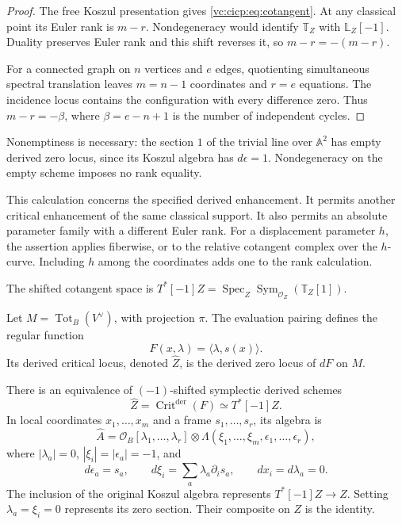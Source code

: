 \begin{proof}
The free Koszul presentation gives \eqref{vc:cicp:eq:cotangent}.
At any classical point its Euler rank is $m-r$.
Nondegeneracy would identify
$\mathbb T_Z$ with $\mathbb L_Z[-1]$. Duality preserves
Euler rank and this shift reverses it, so $m-r=-(m-r)$.

For a connected graph on $n$ vertices and $e$ edges, quotienting
simultaneous spectral translation leaves $m=n-1$ coordinates
and $r=e$ equations. The incidence locus contains the
configuration with every difference zero. Thus $m-r=-\beta$, where
$\beta=e-n+1$ is the number of independent cycles.
\end{proof}

Nonemptiness is necessary: the section $1$ of the trivial
line over $\mathbb A^2$ has empty derived zero locus, since
its Koszul algebra has $d\epsilon=1$. Nondegeneracy on the
empty scheme imposes no rank equality.

This calculation concerns the specified derived enhancement.
It permits another critical enhancement of the same classical
support. It also permits an absolute parameter family with a
different Euler rank. For a displacement parameter $h$, the
assertion applies fiberwise, or to the relative cotangent
complex over the $h$-curve. Including $h$ among the coordinates
adds one to the rank calculation.

The shifted cotangent space is
$T^*[-1]Z=\operatorname{Spec}_Z
\operatorname{Sym}_{\mathcal O_Z}(\mathbb T_Z[1])$.

Let $M=\operatorname{Tot}_B(V^\vee)$, with projection $\pi$.
The evaluation pairing defines the regular function
\begin{equation}\label{vc:cicp:eq:potential}
 F(x,\lambda)=\langle\lambda,s(x)\rangle.
\end{equation}
Its derived critical locus, denoted $\widehat Z$, is the derived
zero locus of $dF$ on $M$.

\begin{theorem}\label{vc:cicp:thm:completion}
There is an equivalence of $(-1)$-shifted symplectic derived
schemes
\begin{equation}\label{vc:cicp:eq:completion}
 \widehat Z=\operatorname{Crit}^{\mathrm{der}}(F)
       \simeq T^*[-1]Z.
\end{equation}
In local coordinates $x_1,\ldots,x_m$ and a frame
$s_1,\ldots,s_r$, its algebra is
\begin{equation}\label{vc:cicp:eq:critical-algebra}
 \widehat A=\mathcal O_B[\lambda_1,\ldots,\lambda_r]
       \otimes\Lambda(\xi_1,\ldots,\xi_m,
                       \epsilon_1,\ldots,\epsilon_r),
\end{equation}
where $|\lambda_a|=0$, $|\xi_i|=|\epsilon_a|=-1$, and
\begin{equation}\label{vc:cicp:eq:differential}
 d\epsilon_a=s_a,\qquad
 d\xi_i=\sum_a\lambda_a\partial_i s_a,\qquad
 dx_i=d\lambda_a=0.
\end{equation}
The inclusion of the original Koszul algebra represents
$T^*[-1]Z\to Z$. Setting $\lambda_a=\xi_i=0$ represents
its zero section. Their composite on $Z$ is the identity.
\end{theorem}

